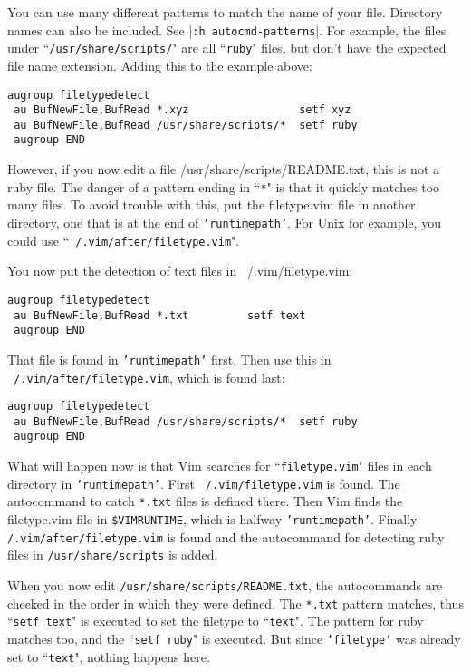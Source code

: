 You can use many different patterns to match the name of your file.
Directory names can also be included.
See |\texttt{:h autocmd-patterns}|.
For example, the files under ``\texttt{/usr/share/scripts/}" are all ``\texttt{ruby}" files, but don't have the expected file name extension.
Adding this to the example above:

\begin{Verbatim}[samepage=true]
 augroup filetypedetect
 au BufNewFile,BufRead *.xyz                 setf xyz
 au BufNewFile,BufRead /usr/share/scripts/*  setf ruby
 augroup END
\end{Verbatim}

However, if you now edit a file /usr/share/scripts/README.txt, this is not a
ruby file.  The danger of a pattern ending in ``\texttt{*}" is that it quickly matches
too many files.  To avoid trouble with this, put the filetype.vim file in
another directory, one that is at the end of \texttt{'runtimepath'}.  For Unix for
example, you could use ``\texttt{~/.vim/after/filetype.vim}".

You now put the detection of text files in ~/.vim/filetype.vim:

\begin{Verbatim}[samepage=true]
 augroup filetypedetect
 au BufNewFile,BufRead *.txt         setf text
 augroup END
\end{Verbatim}

That file is found in \texttt{'runtimepath'} first.
Then use this in \texttt{~/.vim/after/filetype.vim}, which is found last:

\begin{Verbatim}[samepage=true]
 augroup filetypedetect
 au BufNewFile,BufRead /usr/share/scripts/*  setf ruby
 augroup END
\end{Verbatim}

What will happen now is that Vim searches for ``\texttt{filetype.vim}" files in each directory in \texttt{'runtimepath'}.
First \texttt{~/.vim/filetype.vim} is found.
The autocommand to catch \texttt{*.txt} files is defined there.
Then Vim finds the filetype.vim file in \texttt{\$VIMRUNTIME}, which is halfway \texttt{'runtimepath'}.
Finally \texttt{/.vim/after/filetype.vim} is found and the autocommand for detecting ruby files in \texttt{/usr/share/scripts} is added.

When you now edit \texttt{/usr/share/scripts/README.txt}, the autocommands are checked in the order in which they were defined.
The \texttt{*.txt} pattern matches, thus ``\texttt{setf text}" is executed to set the filetype to ``\texttt{text}".
The pattern for ruby matches too, and the ``\texttt{setf ruby}" is executed.
But since \texttt{'filetype'} was already set to ``\texttt{text}", nothing happens here.

